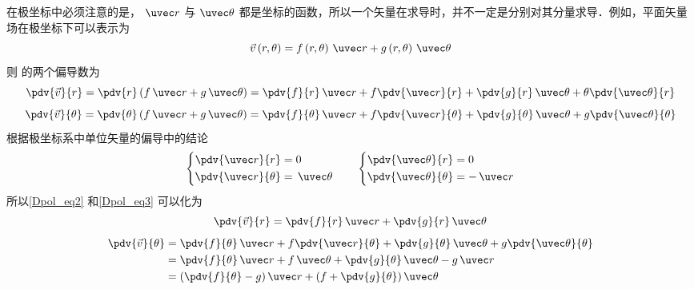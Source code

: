 

在极坐标中必须注意的是， $\uvec r$ 与 $\uvec \theta $ 都是坐标的函数，所以一个矢量在求导时，并不一定是分别对其分量求导．例如，平面矢量场在极坐标下可以表示为
\begin{equation}\label{Dpol_eq1}
\vec v\left( {r,\theta } \right) = f\left( {r,\theta } \right)\,\uvec r + g\left( {r,\theta } \right)\,\uvec \theta 
\end{equation}
则 的两个偏导数为
\begin{equation}\label{Dpol_eq2}
\pdv{\vec v}{r} = \pdv{r} \left( {f\,\uvec r + g\,\uvec \theta } \right) = \pdv{f}{r}\,\uvec r + f\pdv{\uvec r}{r} + \pdv{g}{r}\,\uvec \theta  + \theta \pdv{\uvec \theta}{r}
\end{equation}
\begin{equation}\label{Dpol_eq3}
\pdv{\vec v}{\theta} = \pdv{\theta} \left( {f\,\uvec r + g\,\uvec \theta } \right) = \pdv{f}{\theta}\,\uvec r + f\pdv{\uvec r}{\theta} + \pdv{g}{\theta}\,\uvec \theta  + g\pdv{\uvec \theta}{\theta}
\end{equation}
根据极坐标系中单位矢量的偏导中的结论
\begin{equation}
\left\{ \begin{aligned}
\pdv{\uvec r}{r} &= 0\\
\pdv{\uvec r}{\theta} &= \,\uvec \theta 
\end{aligned} \right.
\qquad
\left\{ \begin{aligned}
\pdv{\uvec \theta}{r} &= 0\\
\pdv{\uvec \theta}{\theta} &=  - \,\uvec r
\end{aligned} \right.
\end{equation}
所以\autoref{Dpol_eq2} 和\autoref{Dpol_eq3} 可以化为
\begin{equation}
\pdv{\vec v}{r} = \pdv{f}{r}\,\uvec r + \pdv{g}{r}\,\uvec \theta 
\end{equation}
\begin{equation}\begin{aligned}
\pdv{\vec v}{\theta} &= \pdv{f}{\theta}\,\uvec r + f\pdv{\uvec r}{\theta} + \pdv{g}{\theta}\,\uvec \theta  + g\pdv{\uvec \theta}{\theta}\\
 &= \pdv{f}{\theta}\,\uvec r + f\,\uvec \theta + \pdv{g}{\theta}\,\uvec \theta  - g\,\uvec r\\
 &= \left( {\pdv{f}{\theta} - g} \right)\uvec r + \left( {f + \pdv{g}{\theta}} \right)\uvec \theta 
\end{aligned}\end{equation}
 
